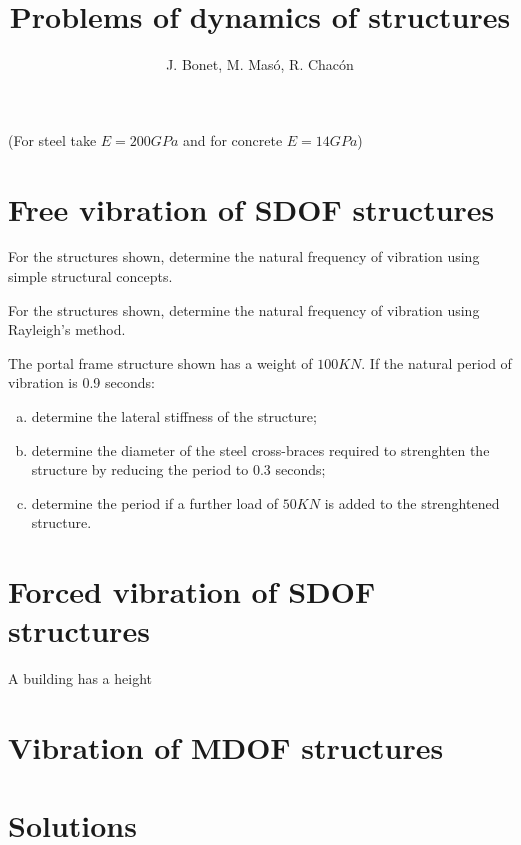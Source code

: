 \documentclass{problems}
\title{Problems of dynamics of structures}
\author{J. Bonet, M. Masó, R. Chacón}
\begin{document}
\maketitle

(For steel take $E=200GPa$ and for concrete $E=14GPa$)

\section{Free vibration of SDOF structures}

For the structures shown, determine the natural frequency of vibration using simple structural concepts.

\begin{center}
    \hspace{2em}
    \hspace{2em}
\end{center}


For the structures shown, determine the natural frequency of vibration using Rayleigh's method.

\begin{center}
\end{center}

\begin{center}
\end{center}


The portal frame structure shown has a weight of $100KN$. If the natural period of vibration is 0.9 seconds:
\begin{enumerate}[(a)]
    \item determine the lateral stiffness of the structure;
    \item determine the diameter of the steel cross-braces required to strenghten the structure by reducing the period to 0.3 seconds;
    \item determine the period if a further load of $50KN$ is added to the strenghtened structure.
\end{enumerate}


\section{Forced vibration of SDOF structures}



 A building has a height

\begin{center}
\end{center}

\section{Vibration of MDOF structures}


\section{Solutions}
\end{document}

